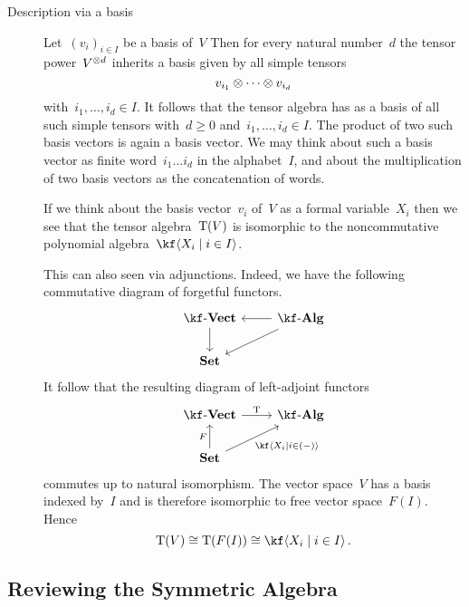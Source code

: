 \begin{recall}
\begin{description}
    \item[Description via a basis]
      Let~$(v_i)_{i \in I}$ be a basis of~$V$
      Then for every natural number~$d$ the tensor power~$V^{\otimes d}$ inherits a basis given by all simple tensors
      \[
        v_{i_1} \otimes \dotsb \otimes v_{i_d}
      \]
      with~$i_1, \dotsc, i_d \in I$.
      It follows that the tensor algebra has as a basis of all such simple tensors with~$d \geq 0$ and~$i_1, \dotsc, i_d \in I$.
      The product of two such basis vectors is again a basis vector.
      We may think about such a basis vector as finite word~$i_1 \dotso i_d$ in the alphabet~$I$, and about the multiplication of two basis vectors as the concatenation of words.
      
      If we think about the basis vector~$v_i$ of~$V$ as a formal variable~$X_i$ then we see that the tensor algebra~$\operatorname{T}(V)$ is isomorphic to the noncommutative polynomial algebra~$\kf\gen{X_i \suchthat i \in I}$.

      This can also seen via adjunctions.
      Indeed, we have the following commutative diagram of forgetful functors.
      \[
        \begin{tikzcd}
          \cVect{\kf}
          \arrow{d}
          &
          \cAlg{\kf}
          \arrow{l}
          \arrow{dl}
          \\
          \cSet
          &
          {}
        \end{tikzcd}
      \]
      It follow that the resulting diagram of left-adjoint functors
      \[
        \begin{tikzcd}
          \cVect{\kf}
          \arrow{r}[above]{\Tensor}
          &
          \cAlg{\kf}
          \\
          \cSet
          \arrow{u}[left]{F}
          \arrow{ur}[below right]{\kf\gen{X_i \suchthat i \in (-)}}
          &
          {}
        \end{tikzcd}
      \]
      commutes up to natural isomorphism.
      The vector space~$V$ has a basis indexed by~$I$ and is therefore isomorphic to free vector space~$F(I)$.
      Hence
      \[
        \Tensor(V)
        \cong
        \Tensor(F(I))
        \cong
        \kf\gen{X_i \suchthat i \in I} \,.
      \]
  \end{description}
\end{recall}





\subsection{Reviewing the Symmetric Algebra}


